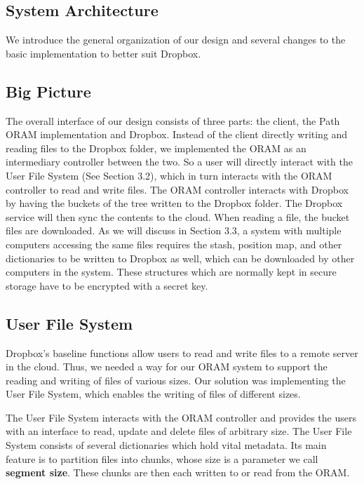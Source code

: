 \documentclass{article}
\begin{document}
\begin{multicols}{2}

\section{System Architecture}

We introduce the general organization of our design and several changes to the basic implementation to better suit Dropbox.

\subsection{Big Picture}


The overall interface of our design consists of three parts: the client, the Path ORAM implementation and Dropbox. Instead of the client directly writing and reading files to the Dropbox folder, we implemented the ORAM as an intermediary controller between the two. So a user will directly interact with the User File System (See Section 3.2), which in turn interacts with the ORAM controller to read and write files. The ORAM controller interacts with Dropbox by having the buckets of the tree written to the Dropbox folder. The Dropbox service will then sync the contents to the cloud. When reading a file, the bucket files are downloaded. As we will discuss in Section 3.3, a system with multiple computers accessing the same files requires the stash, position map, and other dictionaries to be written to Dropbox as well, which can be downloaded by other computers in the system. These structures which are normally kept in secure storage have to be encrypted with a secret key.

\subsection{User File System}

Dropbox’s baseline functions allow users to read and write files to a remote server in the cloud. Thus, we needed a way for our ORAM system to support the reading and writing of files of various sizes. Our solution was implementing the User File System, which enables the writing of files of different sizes. 
\par The User File System interacts with the ORAM controller and provides the users with an interface to read, update and delete files of arbitrary size. The User File System consists of several dictionaries which hold vital metadata. Its main feature is to partition files into chunks, whose size is a parameter we call {\bf segment size}. These chunks are then each written to or read from the ORAM.


\end{multicols}
\end{document}
